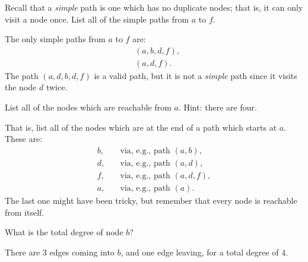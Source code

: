 \begin{prob}
\begin{subprobset}
        \begin{subprob}
            Recall that a \emph{simple} path is one which has no duplicate nodes;
            that is, it can only visit a node once. List all of the simple
            paths from $a$ to $f$.

            \begin{soln}
                The only simple paths from $a$ to $f$ are:
                \begin{align*}
                    &(a,b,d,f),\\ 
                    &(a,d,f).
                \end{align*}
                The path $(a,d,b,d,f)$ is a valid path, but it is not a \emph{simple}
                path since it visits the node $d$ twice.
            \end{soln}
        \end{subprob}

        \begin{subprob}
            List all of the nodes which are reachable from $a$. Hint: there are four.

            \begin{soln}
                That is, list all of the nodes which are at the end of a path
                which starts at $a$. These are:
                \begin{align*}
                    b,&\quad \text{via, e.g., path $(a,b)$},\\
                    d,&\quad \text{via, e.g., path $(a,d)$},\\
                    f,&\quad \text{via, e.g., path $(a,d,f)$},\\
                    a,&\quad \text{via, e.g., path $(a)$.}
                \end{align*}
                The last one might have been tricky, but remember that every node is reachable from itself.
            \end{soln}
        \end{subprob}

        \begin{subprob}
            What is the total degree of node $b$?

            \begin{soln}
                There are 3 edges coming into $b$, and one edge leaving,
                for a total degree of 4.
            \end{soln}
        \end{subprob}
    \end{subprobset}
\end{prob}
